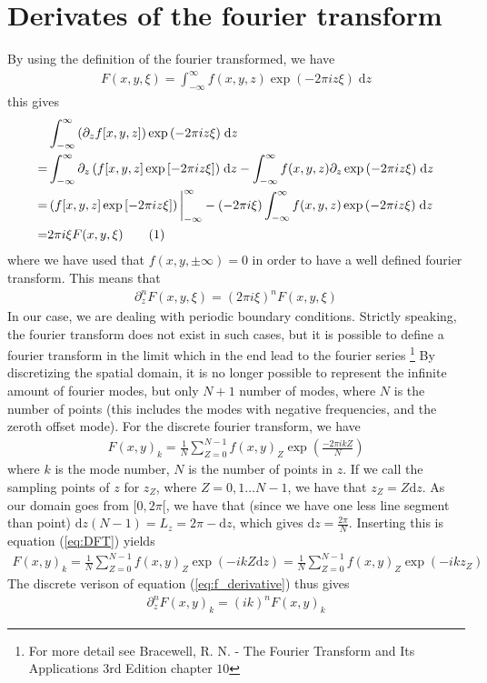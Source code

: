 \documentclass[12pt]{article}
\newcommand{\defi}[4]{\int_{#1}^{#2} {#3} \; \text{d} {#4}} %
\def\L{\left}
\def\R{\right}
\newcommand\numberthis{\addtocounter{equation}{1}\tag{\theequation}}
\begin{document}
\section{Derivates of the fourier transform}
\label{sec:deriv_of_FT}
By using the definition of the fourier transformed, we have
%
\begin{align*}
    F(x,y,\xi) = \defi{-\infty}{\infty}{f(x,y,z)\exp\L(-2\pi iz\xi\R)}{z}
\end{align*}
%
this gives
%
\begin{align*}
    &\defi{-\infty}{\infty}{\L(\partial_zf[x,y,z]\R)\exp\L(-2\pi iz\xi\R)}{z}\\
%
    =& \defi{-\infty}{\infty}{\partial_z\L(f[x,y,z]\exp\L[-2\pi iz\xi\R]\R)}{z}
     - \defi{-\infty}{\infty}{f(x,y,z)\partial_z\exp\L(-2\pi iz\xi\R)}{z}\\
%
    =& \L(f[x,y,z]\exp\L[-2\pi iz\xi\R]\R)\bigg|_{-\infty}^{\infty}
     - \L(-2\pi i\xi\R)\defi{-\infty}{\infty}{f(x,y,z)\exp\L(-2\pi iz\xi\R)}{z}\\
%
    =& 2\pi i\xi F(x,y,\xi)
    \numberthis
    \label{eq:f_derivative}
\end{align*}
%
where we have used that $f(x,y,\pm\infty)=0$ in order to have a well defined
fourier transform. This means that
%
\begin{align*}
    \partial_z^n F(x,y,\xi) = (2\pi i \xi)^n F(x,y,\xi)
\end{align*}
%
In our case, we are dealing with periodic boundary conditions. Strictly
speaking, the fourier transform does not exist in such cases, but it is
possible to define a fourier transform in the limit which in the end lead to
the fourier series%
\footnote{For more detail see Bracewell, R. N. - The Fourier Transform and Its
Applications 3rd Edition chapter $10$}%
%
By discretizing the spatial domain, it is no longer possible to represent the
infinite amount of fourier modes, but only $N+1$ number of modes, where $N$ is
the number of points (this includes the modes with negative frequencies, and
the zeroth offset mode). For the discrete fourier transform, we have
%
\begin{align}
    F(x,y)_{k} =
    \frac{1}{N}\sum_{Z=0}^{N-1}f(x,y)_{Z}\exp\L(\frac{-2\pi i k Z}{N}\R)
    \label{eq:DFT}
\end{align}
%
where $k$ is the mode number, $N$ is the number of points in $z$. If we call
the sampling points of $z$ for $z_Z$, where $Z = 0, 1 \ldots N-1$, we have
that $z_Z = Z \text{d}z$. As our domain goes from $[0, 2\pi[$, we have that
(since we have one less line segment than point) $\text{d}z (N-1) = L_z
= 2\pi - \text{d}z$, which gives $\text{d}z = \frac{2\pi}{N}$. Inserting this
is equation (\ref{eq:DFT}) yields
%
\begin{align*}
    F(x,y)_{k}
    = \frac{1}{N}\sum_{Z=0}^{N-1}f(x,y)_{Z}\exp\L( - i k Z\text{d}z\R)
    = \frac{1}{N}\sum_{Z=0}^{N-1}f(x,y)_{Z}\exp\L( - i k z_Z\R)
    \label{eq:DFT}
\end{align*}
%
The discrete verison of equation (\ref{eq:f_derivative}) thus gives
%
\begin{align*}
    \partial_z^n F(x,y)_k = (i k)^n F(x,y)_k
\end{align*}
%
\end{document}
